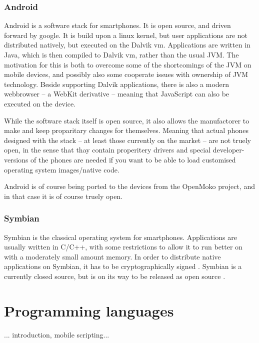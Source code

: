 \documentclass[11pt]{report}
\begin{document}
\subsubsection{Android}

Android is a software stack for smartphones. It is open source, and driven forward by google.
It is build upon a linux kernel, but user applications are not distributed natively, but executed on the Dalvik vm. Applications are written in Java, which is then compiled to Dalvik vm, rather than the usual JVM. The motivation for this is both to overcome some of the shortcomings of the JVM on mobile devices, and possibly also some cooperate issues with ownership of JVM technology.
Beside supporting Dalvik applications, there is also a modern webbrowser -- a WebKit derivative -- meaning that JavaScript can also be executed on the device.

While the software stack itself is open source, it also allows the manufactorer to make and keep proparitary changes for themselves. 
Meaning that actual phones designed with the stack -- at least those currently on the market -- are not truely open, in the sense that thay contain properitery drivers and special developer-versions of the phones are needed if you want to be able to load customised operating system images/native code.

Android is of course being ported to the devices from the OpenMoko project, and in that case it is of course truely open.

\subsubsection{Symbian}

Symbian is the classical operating system for smartphones. Applications are usually written in C/C++, with some restrictions to allow it to run better on with a moderately small amount memory. 
In order to distribute native applications on Symbian, it has to be cryptographically signed \cite{symbiansigned}.
Symbian is a currently closed source, but is on its way to be released as open source \cite{symbianopensource}.

\section{Programming languages}
... introduction, mobile scripting...
\end{document}
